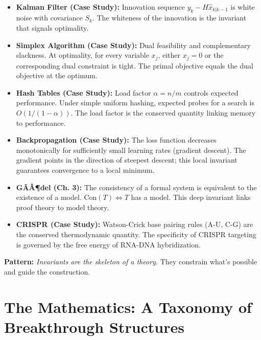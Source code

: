 \begin{itemize}
\item \textbf{Kalman Filter (Case Study):} Innovation sequence $y_k - H\hat{x}_{k|k-1}$ is white noise with covariance $S_k$. The whiteness of the innovation is the invariant that signals optimality.

\item \textbf{Simplex Algorithm (Case Study):} Dual feasibility and complementary slackness. At optimality, for every variable $x_j$, either $x_j = 0$ or the corresponding dual constraint is tight. The primal objective equals the dual objective at the optimum.

\item \textbf{Hash Tables (Case Study):} Load factor $\alpha = n/m$ controls expected performance. Under simple uniform hashing, expected probes for a search is $O(1/(1-\alpha))$. The load factor is the conserved quantity linking memory to performance.

\item \textbf{Backpropagation (Case Study):} The loss function decreases monotonically for sufficiently small learning rates (gradient descent). The gradient points in the direction of steepest descent; this local invariant guarantees convergence to a local minimum.

\item \textbf{GÃÂ¶del (Ch. 3):} The consistency of a formal system is equivalent to the existence of a model. $\text{Con}(T) \iff T$ has a model. This deep invariant links proof theory to model theory.

\item \textbf{CRISPR (Case Study):} Watson-Crick base pairing rules (A-U, C-G) are the conserved thermodynamic quantity. The specificity of CRISPR targeting is governed by the free energy of RNA-DNA hybridization.
\end{itemize}

\begin{mentalLeap}\textbf{Pattern:} \emph{Invariants are the skeleton of a theory.} They constrain what's possible and guide the construction.\end{mentalLeap}
\section{The Mathematics: A Taxonomy of Breakthrough Structures}
\label{sec:anatomy:math}

